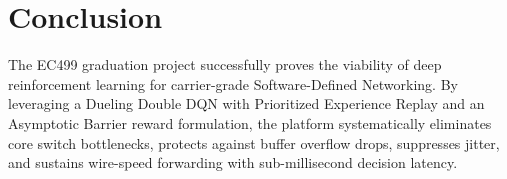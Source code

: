 \documentclass[11pt,a4paper]{article}
\begin{document}
\section{Conclusion}

The EC499 graduation project successfully proves the viability of deep reinforcement learning for carrier-grade Software-Defined Networking. By leveraging a Dueling Double DQN with Prioritized Experience Replay and an Asymptotic Barrier reward formulation, the platform systematically eliminates core switch bottlenecks, protects against buffer overflow drops, suppresses jitter, and sustains wire-speed forwarding with sub-millisecond decision latency.
\end{document}
